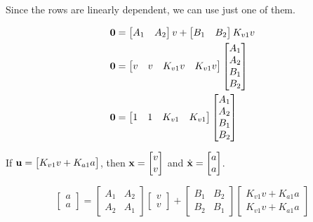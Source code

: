 Since the rows are linearly dependent, we can use just one of them.

\begin{align*}
  \mathbf{0} &=
    \begin{bmatrix}
      A_1 & A_2
    \end{bmatrix} v +
    \begin{bmatrix}
      B_1 & B_2
    \end{bmatrix} K_{v1} v \\
  \mathbf{0} &=
    \begin{bmatrix}
      v & v & K_{v1} v & K_{v1} v
    \end{bmatrix}
    \begin{bmatrix}
      A_1 \\
      A_2 \\
      B_1 \\
      B_2
    \end{bmatrix} \\
  \mathbf{0} &=
    \begin{bmatrix}
      1 & 1 & K_{v1} & K_{v1}
    \end{bmatrix}
    \begin{bmatrix}
      A_1 \\
      A_2 \\
      B_1 \\
      B_2
    \end{bmatrix}
\end{align*}

If $\mathbf{u} =
\begin{bmatrix}
  K_{v1} v + K_{a1} a
\end{bmatrix}$, then $\mathbf{x} =
\begin{bmatrix}
  v \\
  v
\end{bmatrix}$ and $\dot{\mathbf{x}} =
\begin{bmatrix}
  a \\
  a
\end{bmatrix}$.

\begin{equation*}
  \begin{bmatrix}
    a \\
    a
  \end{bmatrix} =
  \begin{bmatrix}
    A_1 & A_2 \\
    A_2 & A_1
  \end{bmatrix}
  \begin{bmatrix}
    v \\
    v
  \end{bmatrix} +
  \begin{bmatrix}
    B_1 & B_2 \\
    B_2 & B_1
  \end{bmatrix}
  \begin{bmatrix}
    K_{v1} v + K_{a1} a \\
    K_{v1} v + K_{a1} a
  \end{bmatrix}
\end{equation*}

